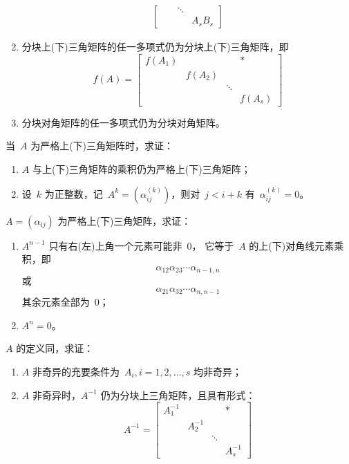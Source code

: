 \documentclass[twoside,openright]{book}
\begin{document}
\begin{CJK*}{UTF8}{}
\begin{quest}
\begin{enumerate}
\[\begin{split}
\begin{bmatrix}
                &                 & \ddots          &     \\
                &                 &                 & A_sB_s
\end{bmatrix}
\end{split}
\]
\item
分块上(下)三角矩阵的任一多项式仍为分块上(下)三角矩阵，即
\[
f(A)=
\begin{bmatrix}
f(A_1)          &                 &                 & *   \\
                & f(A_2)          &                 &     \\
                &                 & \ddots          &     \\
                &                 &                 & f(A_s)
\end{bmatrix}
\]
\item
分块对角矩阵的任一多项式仍为分块对角矩阵。
\end{enumerate}
\end{quest}

\begin{quest}
\label{quest:45}
当\ $A$ 为严格上(下)三角矩阵时，求证：
\begin{enumerate}
\item
$A$ 与上(下)三角矩阵的乘积仍为严格上(下)三角矩阵；
\item
设\ $k$ 为正整数，记\ $A^k=(\alpha^{(k)}_{ij})$，则对\ $j<i+k$ 有\ $\alpha^{(k)}_{ij}=0$。
\end{enumerate}
\end{quest}

\begin{quest}
\label{quest:46}
$A=(\alpha_{ij})$ 为严格上(下)三角矩阵，求证：
\begin{enumerate}
\item
$A^{n-1}$ 只有右(左)上角一个元素可能非\ $0$，
它等于\ $A$ 的上(下)对角线元素乘积，即
\[
\alpha_{12}\alpha_{23}\dotsm\alpha_{n-1,n}
\]
或
\[
\alpha_{21}\alpha_{32}\dotsm\alpha_{n,n-1}
\]
其余元素全部为\ $0$；
\item
$A^n=0$。
\end{enumerate}
\end{quest}

\begin{quest}
\label{quest:47}
$A$ 的定义同{}，求证：
\begin{enumerate}
\item
$A$ 非奇异的充要条件为\ $A_i,i=1,2,\dotsc,s$ 均非奇异；
\item
$A$ 非奇异时，$A^{-1}$ 仍为分块上三角矩阵，且具有形式：
\[
A^{-1}=
\begin{bmatrix}
A_1^{-1}        &                 &                 & *   \\
                & A_2^{-1}        &                 &     \\
                &                 & \ddots          &     \\
                &                 &                 & A_s^{-1}
\end{bmatrix}
\]
\end{enumerate}
\end{quest}


\end{CJK*}
\end{document}
